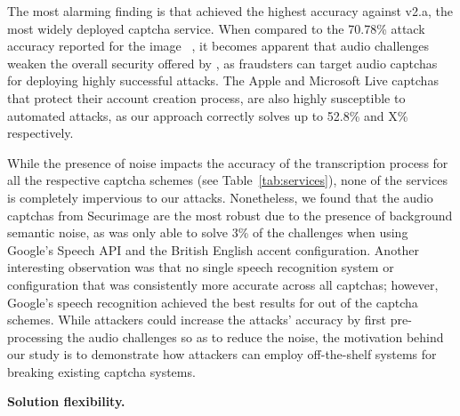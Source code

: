 The most alarming finding is 
that \system achieved the highest accuracy against \re v2.a, the most widely deployed captcha service. When compared 
to the 70.78\% attack accuracy reported for the image \re~\cite{sivakorn:eurosp16}, it becomes apparent that audio challenges
weaken the overall security offered by \re, as fraudsters can target audio captchas for deploying highly successful
attacks. The Apple and Microsoft Live captchas that protect their account creation process, are also highly susceptible to 
automated attacks, as our approach correctly solves up to 52.8\% and X\% respectively.

While the presence of noise impacts the accuracy of the transcription process for all the respective captcha schemes
(see Table~\ref{tab:services}), none of the services is completely impervious to our attacks. Nonetheless, we
found that the audio captchas from Securimage are the most robust due to the presence of background semantic noise,
as \system was only able to solve 3\% of the challenges when using Google's Speech API and the British English accent
configuration. Another interesting observation was that no single speech recognition system or configuration that 
was consistently more accurate across all captchas; however, Google's speech recognition achieved the best
results for  out of the  captcha schemes. While attackers could increase the attacks' accuracy
by first pre-processing the audio challenges so as to reduce the noise, the motivation behind our study is to 
demonstrate how attackers can employ off-the-shelf systems for breaking existing captcha systems.

\textbf{Solution flexibility.} 

